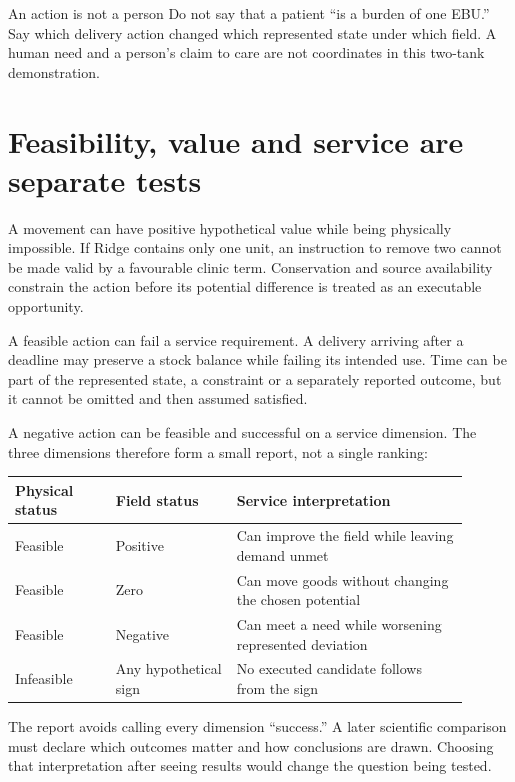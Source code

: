 \begin{cautionbox}{An action is not a person}
Do not say that a patient ``is a burden of one EBU.'' Say which delivery action changed which represented state under which field. A human need and a person's claim to care are not coordinates in this two-tank demonstration.
\end{cautionbox}

\section{Feasibility, value and service are separate tests}
A movement can have positive hypothetical value while being physically impossible. If Ridge contains only one unit, an instruction to remove two cannot be made valid by a favourable clinic term. Conservation and source availability constrain the action before its potential difference is treated as an executable opportunity.

A feasible action can fail a service requirement. A delivery arriving after a deadline may preserve a stock balance while failing its intended use. Time can be part of the represented state, a constraint or a separately reported outcome, but it cannot be omitted and then assumed satisfied.

A negative action can be feasible and successful on a service dimension. The three dimensions therefore form a small report, not a single ranking:
\begin{center}\small
\begin{tabular}{P{0.20\linewidth}P{0.24\linewidth}P{0.46\linewidth}}\toprule
Physical status & Field status & Service interpretation\\\midrule
Feasible & Positive & Can improve the field while leaving demand unmet\\
Feasible & Zero & Can move goods without changing the chosen potential\\
Feasible & Negative & Can meet a need while worsening represented deviation\\
Infeasible & Any hypothetical sign & No executed candidate follows from the sign\\\bottomrule
\end{tabular}
\end{center}

The report avoids calling every dimension ``success.'' A later scientific comparison must declare which outcomes matter and how conclusions are drawn. Choosing that interpretation after seeing results would change the question being tested.

